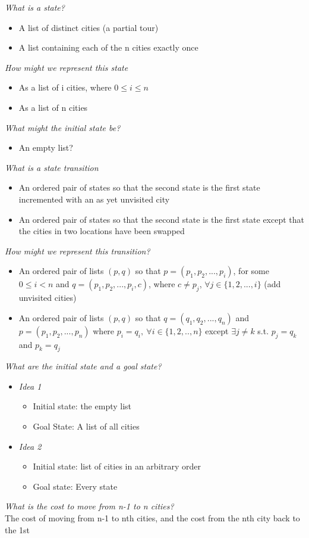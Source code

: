 \documentclass{article}[18pt]
\begin{document}
\textit{What is a state?}
	\begin{itemize}
		\item A list of distinct cities (a partial tour)
		\item A list containing each of the n cities exactly once
	\end{itemize}
\textit{How might we represent this state}
\begin{itemize}
	\item As a list of i cities, where $0\leqslant i \leqslant n$
	\item As a list of n cities 
\end{itemize}
\textit{What might the initial state be?}
\begin{itemize}
	\item An empty list?
\end{itemize}
\textit{What is a state transition}
\begin{itemize}
	\item An ordered pair of states so that the second state is the first state incremented with an as yet unvisited city
	\item An ordered pair of states so that the second state is the first state except that the cities in two locations have been swapped
\end{itemize}
\textit{How might we represent this transition?}
\begin{itemize}
	\item An ordered pair of lists $(p,q)$ so that $p=(p_1,p_2,...,p_i)$, for some $0\leqslant i < n$ and $q=(p_1,p_2,...,p_i,c)$, where $c\neq p_j$, $\forall j \in \{1,2,...,i\}$ (add unvisited cities)
	\item An ordered pair of lists $(p,q)$ so that $q=(q_1,q_2,...,q_n)$ and $p=(p_1,p_2,...,p_n)$ where $p_i=q_i, \ \forall i\in \{1,2,..,n\}$ except $\exists j\neq k$ s.t. $p_j=q_k$ and $p_k=q_j$
\end{itemize}
\textit{What are the initial state and a goal state?}
\begin{itemize}

\item \textit{Idea 1}
\begin{itemize}
	\item Initial state: the empty list
	\item Goal State: A list of all cities
\end{itemize}
\item \textit{Idea 2}
\begin{itemize}
	\item Initial state: list of cities in an arbitrary order
	\item Goal state: Every state
\end{itemize}
\end{itemize}
\textit{What is the cost to move from n-1 to n cities?}\\
The cost of moving from n-1 to nth cities, and the cost from the nth city back to the 1st
\end{document}
